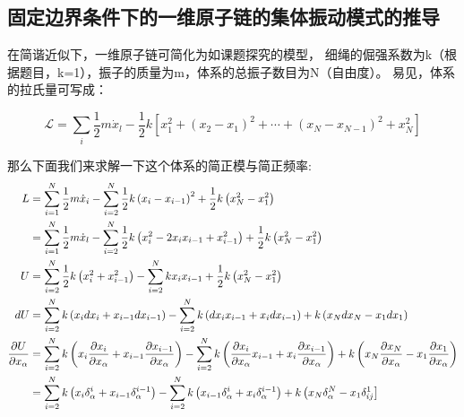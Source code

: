 \documentclass[11pt, a4paper, oneside]{ctexart}
\begin{document}
{{{\begin{appendices}
    \renewcommand{\thesection}{\Alph{section}}
    \subsection{固定边界条件下的一维原子链的集体振动模式的推导}
{
    在简谐近似下，一维原子链可简化为如课题探究的模型，
    细绳的倔强系数为k（根据题目，k=1），振子的质量为m，体系的总振子数目为N（自由度）。
易见，体系的拉氏量可写成：

\begin{equation}
    \mathscr{L}=\sum_{i} \frac{1}{2} m \dot{x}_{l}-\frac{1}{2} k\left[x_{1}^{2}+\left(x_{2}-x_{1}\right)^{2}+\cdots+\left(x_{N}-x_{N-1}\right)^{2}+x_{N}^{2}\right]
    \end{equation}

    那么下面我们来求解一下这个体系的简正模与简正频率:
\begin{equation*}
        \normalsize{
        \begin{aligned}
        L&=\sum_{i=1}^{N} \frac{1}{2} m \dot{x}_{i}-\sum_{i=2}^{N} \frac{1}{2} k\left(x_{i}-x_{i-1}\right)^{2}+\frac{1}{2} k\left(x_{N}^{2}-x_{1}^{2}\right) \\
        &=\sum_{i=1}^{N} \frac{1}{2} m \dot{x}_{l}-\sum_{i=2}^{N} \frac{1}{2} k\left(x_{i}^{2}-2 x_{i} x_{i-1}+x_{i-1}^{2}\right)+\frac{1}{2} k\left(x_{N}^{2}-x_{1}^{2}\right) \\
        U&=\sum_{i=2}^{N} \frac{1}{2} k\left(x_{i}^{2}+x_{i-1}^{2}\right)-\sum_{i=2}^{N} k x_{i} x_{i-1}+\frac{1}{2} k\left(x_{N}^{2}-x_{1}^{2}\right) \\
        d U&=\sum_{i=2}^{N} k\left(x_{i} d x_{i}+x_{i-1} d x_{i-1}\right)-\sum_{i=2}^{N} k\left(d x_{i} x_{i-1}+x_{i} d x_{i-1}\right)+k\left(x_{N} d x_{N}-x_{1} d x_{1}\right) \\
        \frac{\partial U}{\partial x_{\alpha}}&=\sum_{i=2}^{N} k\left(x_{i} \frac{\partial x_{i}}{\partial x_{\alpha}}+x_{i-1} \frac{\partial x_{i-1}}{\partial x_{\alpha}}\right)-\sum_{i=2}^{N} k\left(\frac{\partial x_{i}}{\partial x_{\alpha}} x_{i-1}+x_{i} \frac{\partial x_{i-1}}{\partial x_{\alpha}}\right)+k\left(x_{N} \frac{\partial x_{N}}{\partial x_{\alpha}}-x_{1} \frac{\partial x_{1}}{\partial x_{\alpha}}\right) \\
        &=\sum_{i=2}^{N} k\left(x_{i} \delta_{\alpha}^{i}+x_{i-1} \delta_{\alpha}^{i-1}\right)-\sum_{i=2}^{N} k\left(x_{i-1} \delta_{\alpha}^{i}+x_{i} \delta_{\alpha}^{i-1}\right)+k\left(x_{N} \delta_{\alpha}^{N}-x_{1} \delta_{i j}^{1}\right]
        \end{aligned}}
        \end{equation*}

}
\end{appendices}}}}
\end{document}
